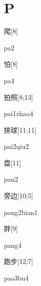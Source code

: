﻿%
\section*{P}

\begin{verbete}[pa2]{爬}[8]
\begin{pronuncia}{pa2}
\end{pronuncia}
\end{verbete}

\begin{verbete}[pa4]{怕}[8]
\begin{pronuncia}{pa4}
\end{pronuncia}
\end{verbete}

\begin{verbete}{拍照}[8;13]
\begin{pronuncia}{pai1zhao4}
\end{pronuncia}
\end{verbete}

\begin{verbete}{排球}[11;11]
\begin{pronuncia}{pai2qiu2}
\end{pronuncia}
\end{verbete}

\begin{verbete}[pan2]{盘}[11]
\begin{pronuncia}{pan2}
\end{pronuncia}
\end{verbete}

\begin{verbete}{旁边}[10;5]
\begin{pronuncia}{pang2bian1}
\end{pronuncia}
\end{verbete}

\begin{verbete}[pang4]{胖}[9]
\begin{pronuncia}{pang4}
\end{pronuncia}
\end{verbete}

\begin{verbete}[pao3bu4]{跑步}[12;7]
\begin{pronuncia}{pao3bu4}
\end{pronuncia}
\end{verbete}

